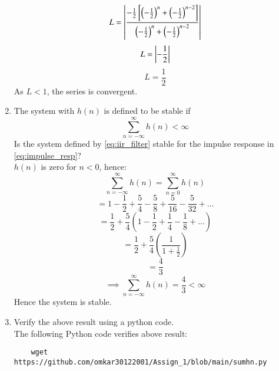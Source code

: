 \documentclass[journal,12pt,twocolumn]{IEEEtran}
\renewcommand\thesection{\arabic{section}}
\begin{document}
\begin{enumerate}[label=\thesection.\arabic*]
\begin{equation}
\end{equation}
\begin{equation}
	L = \left\vert\frac{-\frac{1}{2}\left[{\left(-\frac{1}{2}\right)^{n} + \left(-\frac{1}{2}\right)^{n-2}}\right]}{{\left(-\frac{1}{2}\right)^{n} + \left(-\frac{1}{2}\right)^{n-2}}}\right\vert
\end{equation}
\begin{equation}
	L = \left\vert-\frac{1}{2}\right\vert
\end{equation}
\begin{equation}
	L = \frac{1}{2}
\end{equation}
As $L < 1$, the series is convergent. \\
\item The system with $h(n)$ is defined to be stable if
\begin{equation}
	\sum_{n=-\infty}^{\infty}h(n) < \infty
\end{equation}
Is the system defined by \eqref{eq:iir_filter} stable for the impulse response in \eqref{eq:impulse_resp}? \\
\solution
$h(n)$ is zero for $n<0$, hence:
\begin{equation}
	\sum_{n=-\infty}^{\infty}h(n) = \sum_{n=0}^{\infty}h(n)
\end{equation}
\begin{equation}
	= 1 - \frac{1}{2} + \frac{5}{4} - \frac{5}{8} + \frac{5}{16} - \frac{5}{32} + ...
\end{equation}
\begin{equation}
	= \frac{1}{2} + \frac{5}{4}\left(1 - \frac{1}{2} + \frac{1}{4} - \frac{1}{8} + ...\right)
\end{equation}
\begin{equation}
	= \frac{1}{2} + \frac{5}{4}\left(\frac{1}{1 + \frac{1}{2}}\right)
\end{equation}
\begin{equation}
	= \frac{4}{3}
\end{equation}
\begin{equation}
	\implies \sum_{n=-\infty}^{\infty}h(n) = \frac{4}{3} < \infty
\end{equation}
Hence the system is stable. \\
%
\item Verify the above result using a python code. \\
\solution
The following Python code verifies above result:
\begin{lstlisting}
	wget https://github.com/omkar30122001/Assign_1/blob/main/sumhn.py
\end{lstlisting}

\end{enumerate}
\end{document}
